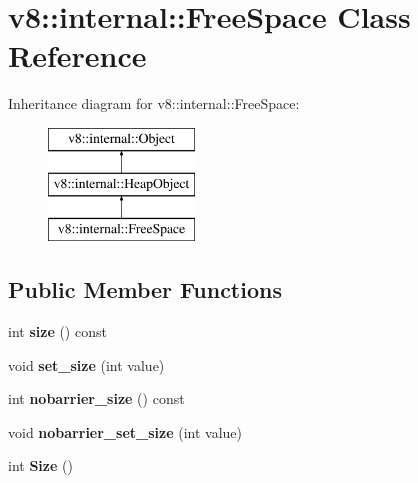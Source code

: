 \hypertarget{classv8_1_1internal_1_1_free_space}{}\section{v8\+:\+:internal\+:\+:Free\+Space Class Reference}
\label{classv8_1_1internal_1_1_free_space}
Inheritance diagram for v8\+:\+:internal\+:\+:Free\+Space\+:\begin{figure}[H]
\begin{center}
\leavevmode
\includegraphics[height=3.000000cm]{classv8_1_1internal_1_1_free_space}
\end{center}
\end{figure}
\subsection*{Public Member Functions}
\begin{DoxyCompactItemize}
\item 
\hypertarget{classv8_1_1internal_1_1_free_space_a083a8d11a9816c6fb13d6bbc8454294e}{}int {\bfseries size} () const \label{classv8_1_1internal_1_1_free_space_a083a8d11a9816c6fb13d6bbc8454294e}

\item 
\hypertarget{classv8_1_1internal_1_1_free_space_ae6e7329405deeb3d629da55f78a56a86}{}void {\bfseries set\+\_\+size} (int value)\label{classv8_1_1internal_1_1_free_space_ae6e7329405deeb3d629da55f78a56a86}

\item 
\hypertarget{classv8_1_1internal_1_1_free_space_a3f4419a93449d772251e418cbee60b81}{}int {\bfseries nobarrier\+\_\+size} () const \label{classv8_1_1internal_1_1_free_space_a3f4419a93449d772251e418cbee60b81}

\item 
\hypertarget{classv8_1_1internal_1_1_free_space_a756059d000a3aee50bc95ff823fe6255}{}void {\bfseries nobarrier\+\_\+set\+\_\+size} (int value)\label{classv8_1_1internal_1_1_free_space_a756059d000a3aee50bc95ff823fe6255}

\item 
\hypertarget{classv8_1_1internal_1_1_free_space_add46e42a33fdf2fca5a450f278f54f48}{}int {\bfseries Size} ()\label{classv8_1_1internal_1_1_free_space_add46e42a33fdf2fca5a450f278f54f48}

\end{DoxyCompactItemize}
